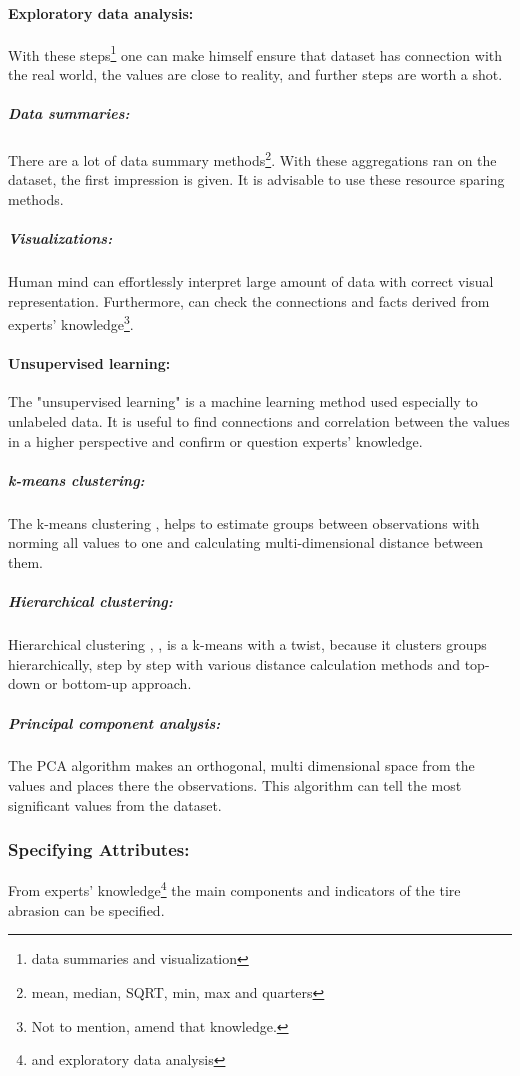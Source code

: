 		\paragraph{Exploratory data analysis:}
			With these steps\footnote{data summaries and visualization} one can make himself ensure that dataset has connection with the real world, the values are close to reality, and further steps are worth a shot.
			\subparagraph{Data summaries:}
			There are a lot of data summary methods\footnote{mean, median, SQRT, min, max and quarters}. With these aggregations ran on the dataset, the first impression is given. It is advisable to use these resource sparing methods.
			\subparagraph{Visualizations:}
			Human mind can effortlessly interpret large amount of data with correct visual representation. Furthermore, can check the connections and facts derived from experts' knowledge\footnote{Not to mention, amend that knowledge.}. 
		\paragraph{Unsupervised learning:}
		The "unsupervised learning" \cite{UnsuplearnBook} is a machine learning method used especially to unlabeled data. It is useful to find connections and correlation between the values in a higher perspective and confirm or question experts' knowledge.
			\subparagraph{k-means clustering:}
			The k-means clustering \cite{k-means}, \cite{kmeans2} helps to estimate groups between observations with norming all values to one and calculating multi-dimensional distance between them.
			\subparagraph{Hierarchical clustering:}
			Hierarchical clustering \cite{h-clust}, \cite{h-clust2}, \cite{Clustering} is a k-means with a twist, because it clusters groups hierarchically, step by step with various distance calculation methods and top-down or bottom-up approach.
			\subparagraph{Principal component analysis:}
			The PCA \cite{PCA} algorithm makes an orthogonal, multi dimensional space from the values and places there the observations. This algorithm can tell the most significant values from the dataset.
	\subsubsection{Specifying Attributes:}
	From experts' knowledge\footnote{and exploratory data analysis} the main components and indicators of the tire abrasion can be specified.

